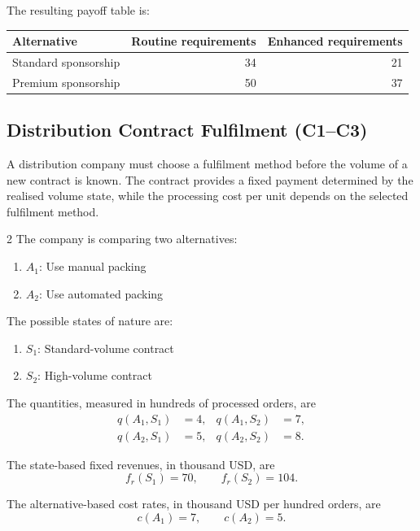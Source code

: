 The resulting payoff table is:

\begin{center}
	\begin{tabular}{lrr}
		\toprule
		Alternative
		& Routine requirements
		& Enhanced requirements \\
		\midrule
		Standard sponsorship & 34 & 21 \\
		Premium sponsorship & 50 & 37 \\
		\bottomrule
	\end{tabular}
\end{center}


\subsection{Distribution Contract Fulfilment (C1--C3)}
\label{sec:problem8-distribution-contract-fulfilment-c1-c3}

A distribution company must choose a fulfilment method before the volume of a
new contract is known. The contract provides a fixed payment determined by the
realised volume state, while the processing cost per unit depends on the
selected fulfilment method.

\begin{multicols}{2}
	The company is comparing two alternatives:
	\begin{enumerate}[label=\arabic*.]
		\item \(A_1\): Use manual packing
		\item \(A_2\): Use automated packing
	\end{enumerate}
	
	The possible states of nature are:
	\begin{enumerate}[label=\arabic*.]
		\item \(S_1\): Standard-volume contract
		\item \(S_2\): High-volume contract
	\end{enumerate}
	
	\columnbreak
	
	The quantities, measured in hundreds of processed orders, are
	\[
	\begin{aligned}
		q(A_1,S_1)&=4,
		&
		q(A_1,S_2)&=7,
		\\
		q(A_2,S_1)&=5,
		&
		q(A_2,S_2)&=8.
	\end{aligned}
	\]
	
	The state-based fixed revenues, in thousand USD, are
	\[
	f_r(S_1)=70,
	\qquad
	f_r(S_2)=104.
	\]
	
	The alternative-based cost rates, in thousand USD per hundred orders, are
	\[
	c(A_1)=7,
	\qquad
	c(A_2)=5.
	\]
\end{multicols}

